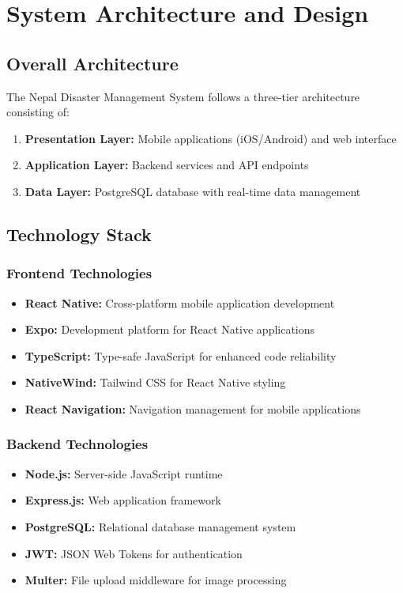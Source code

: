 \documentclass[12pt,a4paper]{article}
\begin{document}
\section{System Architecture and Design}

\subsection{Overall Architecture}

The Nepal Disaster Management System follows a three-tier architecture consisting of:

\begin{enumerate}
    \item \textbf{Presentation Layer:} Mobile applications (iOS/Android) and web interface
    \item \textbf{Application Layer:} Backend services and API endpoints
    \item \textbf{Data Layer:} PostgreSQL database with real-time data management
\end{enumerate}

\subsection{Technology Stack}

\subsubsection{Frontend Technologies}
\begin{itemize}
    \item \textbf{React Native:} Cross-platform mobile application development
    \item \textbf{Expo:} Development platform for React Native applications
    \item \textbf{TypeScript:} Type-safe JavaScript for enhanced code reliability
    \item \textbf{NativeWind:} Tailwind CSS for React Native styling
    \item \textbf{React Navigation:} Navigation management for mobile applications
\end{itemize}

\subsubsection{Backend Technologies}
\begin{itemize}
    \item \textbf{Node.js:} Server-side JavaScript runtime
    \item \textbf{Express.js:} Web application framework
    \item \textbf{PostgreSQL:} Relational database management system
    \item \textbf{JWT:} JSON Web Tokens for authentication
    \item \textbf{Multer:} File upload middleware for image processing
\end{itemize}
\end{document}
